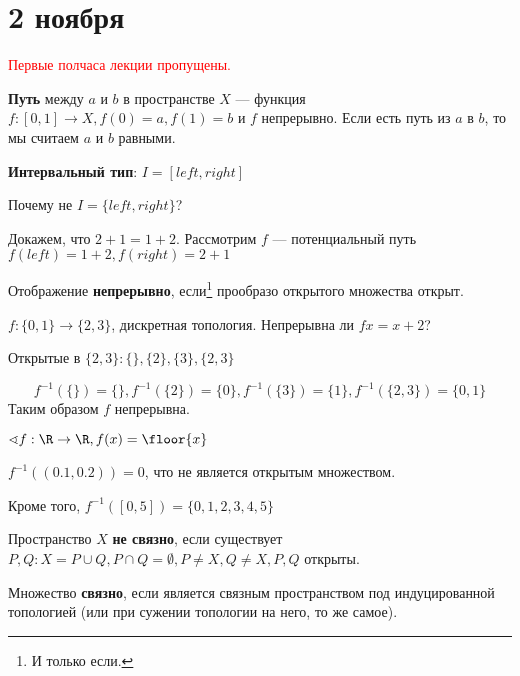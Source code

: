 \chapter{2 ноября}

\textcolor{red}{Первые полчаса лекции пропущены.}

\begin{definition}
    \textbf{Путь} между \(a\) и \(b\) в пространстве \(X\) --- функция \(f : [0, 1] \to X, f(0) = a, f(1) = b\) и \(f\) непрерывно. Если есть путь из \(a\) в \(b\), то мы считаем \(a\) и \(b\) равными.
\end{definition}

\begin{definition}
    \textbf{Интервальный тип}: \(I = [left, right]\)
\end{definition}

Почему не \(I = \{left, right\}\)?

\begin{example}
    Докажем, что \(2 + 1 = 1 + 2\). Рассмотрим \(f\) --- потенциальный путь \(f(left) = 1 + 2, f(right) = 2 + 1\)
\end{example}

\begin{definition}
    Отображение \textbf{непрерывно}, если\footnote{И только если.} прообразо открытого множества открыт.
\end{definition}

\begin{example}
    \(f : \{0, 1\} \to \{2, 3\}\), дискретная топология. Непрерывна ли \(f x = x + 2\)?

    Открытые в \(\{2, 3\} : \{\}, \{2\}, \{3\}, \{2, 3\}\)

    \[f^{-1}(\{\}) = \{\}, f^{-1}(\{2\}) = \{0\}, f^{-1}(\{3\}) = \{1\}, f^{-1}(\{2, 3\}) = \{0, 1\}\]
    Таким образом \(f\) непрерывна.
\end{example}

\begin{example}
    \(\sphericalangle f : \R \to \R, f(x) = \floor{x}\)

    \(f^{-1}((0.1, 0.2)) = 0\), что не является открытым множеством.

    Кроме того, \(f^{-1}([0, 5]) = \{0,1,2,3,4,5\}\)
\end{example}

\begin{definition}
    Пространство \(X\) \textbf{не связно}, если существует \(P, Q : X = P \cup Q, P \cap Q = \emptyset, P \neq X, Q \neq X, P, Q\) открыты.

    Множество \textbf{связно}, если является связным пространством под индуцированной топологией (или при сужении топологии на него, то же самое).
\end{definition}

